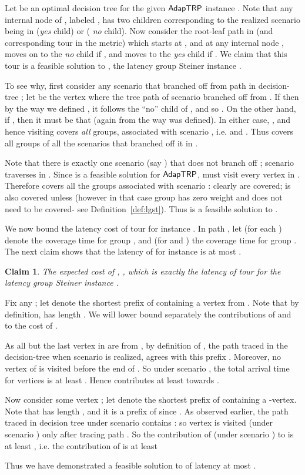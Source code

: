 \documentclass[11pt]{article}
\newtheorem{claim}[thm]{Claim}
\def\strp{\ensuremath{{\sf AdapTRP}}\xspace}
\newenvironment{pf}{

\noindent{\bf Proof:}} {\hfill


}
\begin{document}
\begin{pf}
Let  be an optimal decision tree for the given  \strp instance . Note that any internal node of , labeled
, has two children corresponding to the realized scenario being in  ({\em yes} child) or  ({\em
no} child). Now consider the root-leaf path in  (and corresponding tour  in the metric) which starts at ,
and at any internal node , moves on to the \emph{no} child if , and moves to  the \emph{yes} child if . We claim that this tour is a feasible solution to , the latency group Steiner instance .

To see why, first consider any scenario  that branched off from path   in decision-tree ; let  be
the vertex where the tree path of scenario  branched off from .  If  then by the way we defined
, it follows the ``no'' child of , and so  .  On the other hand, if , then it
must be that  (again from the way  was defined). In  either  case, , and hence visiting  covers {\em all} groups, associated with scenario , i.e.  and . Thus  covers all groups of all the scenarios that branched off it in .

Note that there is exactly one scenario (say ) that does not branch off ; scenario  traverses
 in .
  Since  is a feasible
  solution for \strp,  must visit every vertex in .
  Therefore  covers all the groups associated with
  scenario : clearly  are covered;  is also
  covered unless  (however in that case group  has zero weight and does not need to be covered- see Definition~\ref{def:lgst}). Thus  is a
  feasible solution to .

We now bound the latency cost of tour  for instance . In path , let  (for each
) denote the coverage time for group ,
  and  (for  and ) the coverage time for group .
  The next claim shows that the latency of  for instance  is at most .


\begin{claim} The expected cost of , , which is exactly the latency of tour  for the latency group
Steiner instance .
\end{claim}
\begin{pf}
Fix any ; let  denote the shortest prefix of  containing a vertex from . Note that by
definition,  has length . We will lower bound separately the contributions of  and
 to the cost of .

As all but the last vertex in  are from , by definition of ,
the path  traced in the decision-tree  when scenario  is realized, agrees with this prefix . Moreover,
no vertex of  is visited before the end of . So under scenario , the total arrival time for vertices  is at least . Hence  contributes  at least  towards .

Now consider some vertex ; let  denote the shortest prefix of  containing a
-vertex. Note that  has length , and it is a prefix of  since . As observed earlier, the path traced in decision tree  under scenario   contains : so vertex
 is visited (under scenario ) only after tracing path . So the contribution of  (under scenario
) to  is at least , i.e. the contribution of  is at least 
\end{pf}


Thus we have demonstrated a feasible solution to  of  latency at most .
\end{pf}
\end{document}
